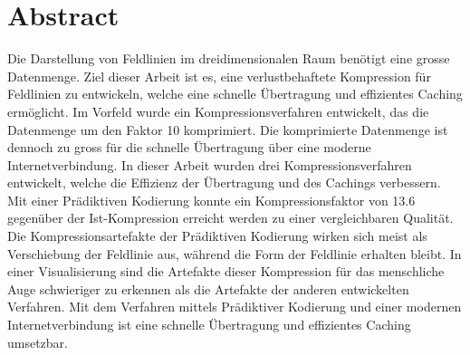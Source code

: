 \section*{Abstract}
Die Darstellung von Feldlinien im dreidimensionalen Raum benötigt eine grosse Datenmenge. Ziel dieser Arbeit ist es, eine verlustbehaftete Kompression für Feldlinien zu entwickeln, welche eine schnelle Übertragung und effizientes Caching ermöglicht. Im Vorfeld wurde ein Kompressionsverfahren entwickelt, das die Datenmenge um den Faktor 10 komprimiert. Die komprimierte Datenmenge ist dennoch zu gross für die schnelle Übertragung über eine moderne Internetverbindung. In dieser Arbeit wurden drei Kompressionsverfahren entwickelt, welche die Effizienz der Übertragung und des Cachings verbessern. Mit einer Prädiktiven Kodierung konnte ein Kompressionsfaktor von 13.6  gegenüber der Ist-Kompression erreicht werden zu einer vergleichbaren Qualität. Die Kompressionsartefakte der Prädiktiven Kodierung wirken sich meist als Verschiebung der Feldlinie aus, während die Form der Feldlinie erhalten bleibt. In einer Visualisierung sind die Artefakte dieser Kompression für das menschliche Auge schwieriger zu erkennen als die Artefakte der anderen entwickelten Verfahren. Mit dem Verfahren mittels Prädiktiver Kodierung und einer modernen Internetverbindung ist eine schnelle Übertragung und effizientes Caching umsetzbar.